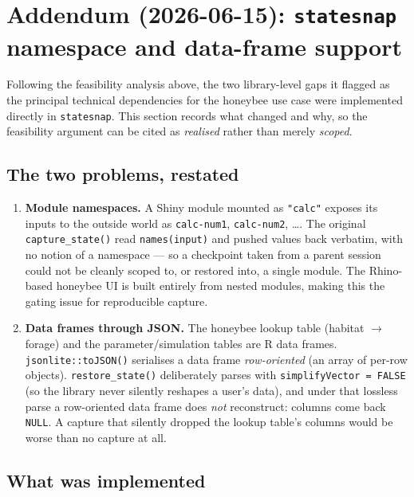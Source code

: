 \documentclass[12pt,a4paper]{article}
\begin{document}
\section{Addendum (2026-06-15): \texttt{statesnap} namespace and data-frame support}
\label{sec:statesnap-update}

Following the feasibility analysis above, the two library-level gaps it flagged
as the principal technical dependencies for the honeybee use case were
implemented directly in \texttt{statesnap}. This section records what changed and
why, so the feasibility argument can be cited as \emph{realised} rather than
merely \emph{scoped}.

\subsection{The two problems, restated}

\begin{enumerate}[nosep]
  \item \textbf{Module namespaces.} A Shiny module mounted as \texttt{"calc"}
    exposes its inputs to the outside world as \texttt{calc-num1},
    \texttt{calc-num2}, \dots. The original \texttt{capture\_state()} read
    \texttt{names(input)} and pushed values back verbatim, with no notion of a
    namespace --- so a checkpoint taken from a parent session could not be
    cleanly scoped to, or restored into, a single module. The Rhino-based
    honeybee UI is built entirely from nested modules, making this the gating
    issue for reproducible capture.
  \item \textbf{Data frames through JSON.} The honeybee lookup table (habitat
    $\to$ forage) and the parameter/simulation tables are R data frames.
    \texttt{jsonlite::toJSON()} serialises a data frame \emph{row-oriented} (an
    array of per-row objects). \texttt{restore\_state()} deliberately parses with
    \texttt{simplifyVector = FALSE} (so the library never silently reshapes a
    user's data), and under that lossless parse a row-oriented data frame does
    \emph{not} reconstruct: columns come back \texttt{NULL}. A capture that
    silently dropped the lookup table's columns would be worse than no capture at
    all.
\end{enumerate}

\subsection{What was implemented}
\end{document}

